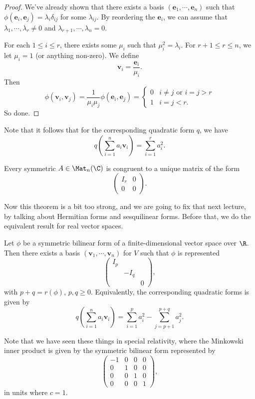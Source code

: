 \documentclass[a4paper]{article}
\begin{document}
\begin{proof}
  We've already shown that there exists a basis $(\mathbf{e}_1, \cdots, \mathbf{e}_n)$ such that $\phi(\mathbf{e}_i, \mathbf{e}_j) = \lambda_i \delta_{ij}$ for some $\lambda_{ij}$. By reordering the $\mathbf{e}_i$, we can assume that $\lambda_1, \cdots, \lambda_r \not= 0$ and $\lambda_{r + 1},\cdots, \lambda_n = 0$.

  For each $1 \leq i \leq r$, there exists some $\mu_i$ such that $\mu_i^2 = \lambda_i$. For $r + 1 \leq r \leq n$, we let $\mu_i = 1$ (or anything non-zero). We define
  \[
    \mathbf{v}_i = \frac{\mathbf{e}_i}{\mu_i}.
  \]
  Then
  \[
    \phi(\mathbf{v}_i, \mathbf{v}_j) = \frac{1}{\mu_i \mu_j} \phi(\mathbf{e}_i, \mathbf{e}_j) =
    \begin{cases}
      0 & i\not= j\text{ or }i = j > r\\
      1 & i = j < r.
    \end{cases}
  \]
  So done.
\end{proof}
Note that it follows that for the corresponding quadratic form $q$, we have
\[
  q\left(\sum_{i = 1}^n a_i \mathbf{v}_i\right) = \sum_{i = 1}^r a_i^2.
\]
\begin{cor}
  Every symmetric $A \in \Mat_n(\C)$ is congruent to a unique matrix of the form
  \[
    \begin{pmatrix}
      I_r & 0\\
      0 & 0
    \end{pmatrix}.
  \]
\end{cor}
Now this theorem is a bit too strong, and we are going to fix that next lecture, by talking about Hermitian forms and sesquilinear forms. Before that, we do the equivalent result for real vector spaces.
\begin{thm}
  Let $\phi$ be a symmetric bilinear form of a finite-dimensional vector space over $\R$. Then there exists a basis $(\mathbf{v}_1, \cdots, \mathbf{v}_n)$ for $V$ such that $\phi$ is represented
  \[
    \begin{pmatrix}
      I_p\\
      & -I_q\\
      & & 0
    \end{pmatrix},
  \]
  with $p + q = r(\phi)$, $p, q \geq 0$. Equivalently, the corresponding quadratic forms is given by
  \[
    q\left(\sum_{i = 1}^n a_i \mathbf{v}_i\right) = \sum_{i = 1}^p a_i^2 - \sum_{j = p + 1}^{p + q} a_j^2.
  \]
\end{thm}
Note that we have seen these things in special relativity, where the Minkowski inner product is given by the symmetric bilinear form represented by
\[
  \begin{pmatrix}
    -1 & 0 & 0 & 0 \\
    0 & 1 & 0 & 0 \\
    0 & 0 & 1 & 0\\
    0 & 0 & 0 & 1
  \end{pmatrix},
\]
in units where $c = 1$.
\end{document}
